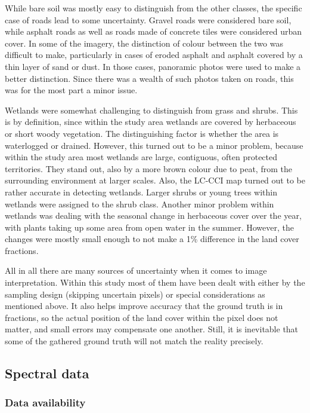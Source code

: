 \documentclass[a4paper,10pt]{book}
\begin{document}
While bare soil was mostly easy to distinguish from the other classes, the specific case of roads lead to some uncertainty. Gravel roads were considered bare soil, while asphalt roads as well as roads made of concrete tiles were considered urban cover. In some of the imagery, the distinction of colour between the two was difficult to make, particularly in cases of eroded asphalt and asphalt covered by a thin layer of sand or dust. In those cases, panoramic photos were used to make a better distinction. Since there was a wealth of such photos taken on roads, this was for the most part a minor issue.

Wetlands were somewhat challenging to distinguish from grass and shrubs. This is by definition, since within the study area wetlands are covered by herbaceous or short woody vegetation. The distinguishing factor is whether the area is waterlogged or drained. However, this turned out to be a minor problem, because within the study area most wetlands are large, contiguous, often protected territories. They stand out, also by a more brown colour due to peat, from the surrounding environment at larger scales. Also, the LC-CCI map turned out to be rather accurate in detecting wetlands. Larger shrubs or young trees within wetlands were assigned to the shrub class. Another minor problem within wetlands was dealing with the seasonal change in herbaceous cover over the year, with plants taking up some area from open water in the summer. However, the changes were mostly small enough to not make a 1\% difference in the land cover fractions.

All in all there are many sources of uncertainty when it comes to image interpretation. Within this study most of them have been dealt with either by the sampling design (skipping uncertain pixels) or special considerations as mentioned above. It also helps improve accuracy that the ground truth is in fractions, so the actual position of the land cover within the pixel does not matter, and small errors may compensate one another. Still, it is inevitable that some of the gathered ground truth will not match the reality precisely.

\subsection{Spectral data}
\label{sec-spectral}

\subsubsection{Data availability}
\end{document}
